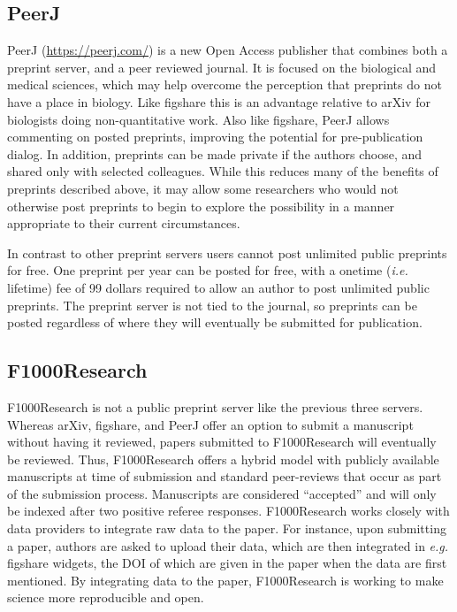 \documentclass[letterpaper,twocolumn,superscriptaddress,showkeys,longbibliography]{revtex4-1}
\begin{document}
\subsection{PeerJ}

PeerJ (\href{https://peerj.com/}{https://peerj.com/}) is a new Open Access
publisher that combines both a preprint server, and a peer reviewed journal.  It
is focused on the biological and medical sciences, which may help overcome the
perception that preprints do not have a place in biology. Like figshare this is
an advantage relative to arXiv for biologists doing non-quantitative work.  Also
like figshare, PeerJ allows commenting on posted preprints, improving the
potential for pre-publication dialog. In addition, preprints can be made private
if the authors choose, and shared only with selected colleagues. While this
reduces many of the benefits of preprints described above, it may allow some
researchers who would not otherwise post preprints to begin to explore the
possibility in a manner appropriate to their current circumstances.

In contrast to other preprint servers users cannot post unlimited public
preprints for free. One preprint per year can be posted for free, with a onetime
(\emph{i.e.} lifetime) fee of 99 dollars required to allow an author to post unlimited
public preprints. The preprint server is not tied to the journal, so preprints
can be posted regardless of where they will eventually be submitted for
publication.

\subsection{F1000Research}

F1000Research is not a public preprint server like the previous three servers.
Whereas arXiv, figshare, and PeerJ offer an option to submit a manuscript
without having it reviewed, papers submitted to F1000Research will eventually
be reviewed. Thus, F1000Research offers a hybrid model with publicly available
manuscripts at time of submission and standard peer-reviews that occur as part
of the submission process. Manuscripts are considered ``accepted'' and will
only be indexed after two positive referee responses. F1000Research works
closely with data providers to integrate raw data to the paper. For instance,
upon submitting a paper, authors are asked to upload their data, which are then
integrated in \emph{e.g.} figshare widgets, the DOI of which are given in the
paper when the data are first mentioned.  By integrating data to the paper,
F1000Research is working to make science more reproducible and open.
\end{document}
